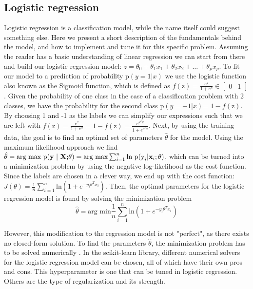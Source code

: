 \documentclass{article}
\begin{document}
\subsection{Logistic regression}
Logistic regression is a classification model, while the name itself could suggest something else. Here we present a short description of the fundamentals behind the model, and how to implement and tune it for this specific problem. Assuming the reader has a basic understanding of linear regression we can start from there and build our logistic regression model: $z = \theta_0 + \theta_1x_1 + \theta_2x_2 + \ldots + \theta_px_p$. To fit our model to a prediction of probability $\text{p}(y = 1 | x) $ we use the logistic function also known as the Sigmoid function, which is defined as $f(\text{z}) = \frac{e^{z}} {1 + e^{z}} \in \begin{bmatrix} 0& 1 \end{bmatrix}$. Given the probability of one class in the case of a classification problem with 2 classes, we have the probability for the second class $\text{p}(y = -1 | x)$= $ 1 - f(\text{z})$. By choosing 1 and -1 as the labels we can simplify our expressions such that we are left with $f(\text{z}) = \frac{e^{z}} {1 + e^{z}} = 1 - f(\text{z}) = \frac{e^{\theta^{T}x}} {1+e^{\theta^{T}x}}$. Next, by using the training data, the goal is to find an optimal set of parameters $\hat{\theta}$ for the model. Using the maximum likelihood approach we find $\hat{\theta} = \text{arg max p(\textbf{y} $|$ \textbf{X;$\theta$})} = \text{arg max} \sum_{i=1}^{n} \text{ln } \text{p(y}_i | \textbf{x}_i;\theta)$, which can be turned into a minimization problem by using the negative log-likelihood as the cost function. Since the labels are chosen in a clever way, we end up with the cost function: $J(\theta) = \frac{1} {n} \sum_{i=1}^{n} \text{ln}(1+e^{-y_i\theta^{T}x_i})$. Then, the optimal parameters for the logistic regression model is found by solving the minimization problem
\begin{equation}
\hat{\theta} = \text{arg min} \frac{1} {n} \sum_{i=1}^{n} \text{ln}(1+e^{-y_i\theta^{T}x_i})
\end{equation}

However, this modification to the regression model is not "perfect", as there exists no closed-form solution. To find the parameters $\hat{\theta}$, the minimization problem has to be solved numerically \cite{smlbook}. In the scikit-learn library, different numerical solvers for the logistic regression model can be chosen, all of which have their own pros and cons. This hyperparameter is one that can be tuned in logistic regression. Others are the type of regularization and its strength.\\
\end{document}

